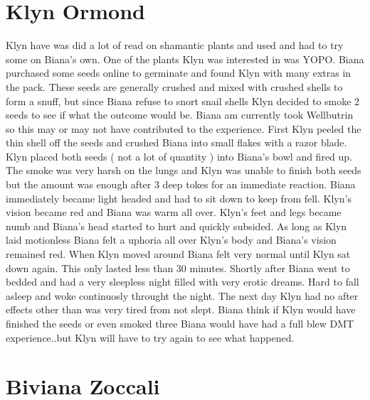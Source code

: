 \documentclass[12pt]{book}
\begin{document}
\chapter{Klyn Ormond}

Klyn have was did a lot of read on shamantic plants and used and had to try some on Biana's own. One of the plants Klyn was interested in was YOPO. Biana purchased some seeds online to germinate and found Klyn with many extras in the pack. These seeds are generally crushed and mixed with crushed shells to form a snuff, but since Biana refuse to snort snail shells Klyn decided to smoke 2 seeds to see if what the outcome would be. Biana am currently took Wellbutrin so this may or may not have contributed to the experience. First Klyn peeled the thin shell off the seeds and crushed Biana into small flakes with a razor blade. Klyn placed both seeds ( not a lot of quantity ) into Biana's bowl and fired up. The smoke was very harsh on the lungs and Klyn was unable to finish both seeds but the amount was enough after 3 deep tokes for an immediate reaction. Biana immediately became light headed and had to sit down to keep from fell. Klyn's vision became red and Biana was warm all over. Klyn's feet and legs became numb and Biana's head started to hurt and quickly subsided. As long as Klyn laid motionless Biana felt a uphoria all over Klyn's body and Biana's vision remained red. When Klyn moved around Biana felt very normal until Klyn sat down again. This only lasted less than 30 minutes. Shortly after Biana went to bedded and had a very sleepless night filled with very erotic dreams. Hard to fall asleep and woke continuosly throught the night. The next day Klyn had no after effects other than was very tired from not slept. Biana think if Klyn would have finished the seeds or even smoked three Biana would have had a full blew DMT experience..but Klyn will have to try again to see what happened.






\chapter{Biviana Zoccali}
\end{document}
